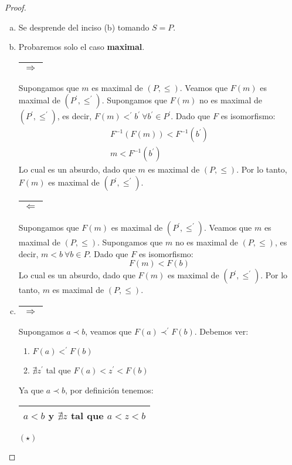\begin{proof}
\begin{enumerate}[a)]
      \item Se desprende del inciso (b) tomando $S = P$.
      \item Probaremos solo el caso \textbf{maximal}.
        \PN \begin{tabular}{|c|} \hline $\Rightarrow$ \\\hline \end{tabular} Supongamos que $m$ es maximal de
        $(P, \leq)$. Veamos que $F(m)$ es maximal de $(P^{\prime}, \leq^{\prime})$. Supongamos que $F(m)$ no es maximal
        de $(P^{\prime}, \leq^{\prime})$, es decir, $F(m) <^{\prime} b^{\prime} \ \forall b^{\prime} \in P^{\prime}$.
        Dado que $F$ es isomorfismo:
        \begin{eqnarray*}
    			F^{-1}(F(m)) < F^{-1}(b^{\prime}) \\
    			m < F^{-1}(b^{\prime})
    		\end{eqnarray*}
        \PN Lo cual es un absurdo, dado que $m$ es maximal de $(P, \leq)$. Por lo tanto, $F(m)$ es maximal de
        $(P^{\prime}, \leq^{\prime})$.

        \PN \begin{tabular}{|c|} \hline $\Leftarrow$ \\\hline \end{tabular} Supongamos que $F(m)$ es maximal de
        $(P^{\prime}, \leq^{\prime})$. Veamos que $m$ es maximal de $(P, \leq)$. Supongamos que $m$ no es maximal
        de $(P, \leq)$, es decir, $m < b \ \forall b \in P$. Dado que $F$ es isomorfismo:
        \[
    			F(m) < F(b)
    		\]
        \PN Lo cual es un absurdo, dado que $F(m)$ es maximal de $(P^{\prime}, \leq^{\prime})$. Por lo tanto, $m$ es
        maximal de $(P, \leq)$.

      \item \begin{tabular}{|c|} \hline $\Rightarrow$ \\\hline \end{tabular} Supongamos $a \prec b$, veamos que $F(a)
        \prec^{\prime} F(b)$. Debemos ver:
        \begin{enumerate}[1)]
          \item $F(a) <^{\prime} F(b)$
          \item $\nexists z^{\prime}$ tal que $F(a) < z^{\prime} < F(b)$
        \end{enumerate}

        \PN Ya que $a \prec b$, por definición tenemos: \begin{tabular}{|c|} \hline $a < b$ y $\nexists z$ tal que
        $a < z < b$ \\\hline \end{tabular} $(\star)$


\end{enumerate}
\end{proof}
